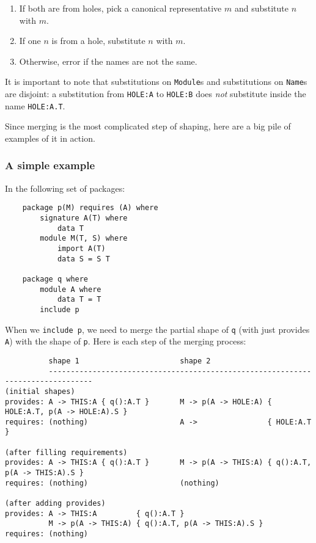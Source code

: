 \documentclass{article}
\begin{document}
\begin{enumerate}
    \item If both are from holes, pick a canonical representative $m$ and substitute $n$ with $m$.
    \item If one $n$ is from a hole, substitute $n$ with $m$.
    \item Otherwise, error if the names are not the same.
\end{enumerate}
%
It is important to note that substitutions on \verb|Module|s and substitutions on
\verb|Name|s are disjoint: a substitution from \verb|HOLE:A| to \verb|HOLE:B|
does \emph{not} substitute inside the name \verb|HOLE:A.T|.

Since merging is the most complicated step of shaping, here are a big
pile of examples of it in action.

\subsubsection{A simple example}

In the following set of packages:

\begin{verbatim}
    package p(M) requires (A) where
        signature A(T) where
            data T
        module M(T, S) where
            import A(T)
            data S = S T

    package q where
        module A where
            data T = T
        include p
\end{verbatim}

When we \verb|include p|, we need to merge the partial shape
of \verb|q| (with just provides \verb|A|) with the shape
of \verb|p|.  Here is each step of the merging process:

\begin{verbatim}
          shape 1                       shape 2
          --------------------------------------------------------------------------------
(initial shapes)
provides: A -> THIS:A { q():A.T }       M -> p(A -> HOLE:A) { HOLE:A.T, p(A -> HOLE:A).S }
requires: (nothing)                     A ->                { HOLE:A.T }

(after filling requirements)
provides: A -> THIS:A { q():A.T }       M -> p(A -> THIS:A) { q():A.T, p(A -> THIS:A).S }
requires: (nothing)                     (nothing)

(after adding provides)
provides: A -> THIS:A         { q():A.T }
          M -> p(A -> THIS:A) { q():A.T, p(A -> THIS:A).S }
requires: (nothing)
\end{verbatim}
\end{document}
